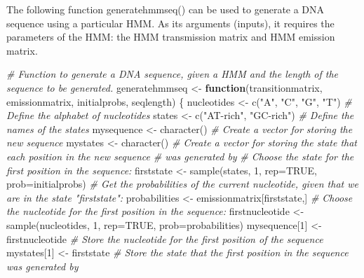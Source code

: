 \documentclass[
]{book}
\newenvironment{Shaded}{\begin{snugshade}}{\end{snugshade}}
\newcommand{\AttributeTok}[1]{\textcolor[rgb]{0.77,0.63,0.00}{#1}}
\newcommand{\CommentTok}[1]{\textcolor[rgb]{0.56,0.35,0.01}{\textit{#1}}}
\newcommand{\ConstantTok}[1]{\textcolor[rgb]{0.00,0.00,0.00}{#1}}
\newcommand{\ControlFlowTok}[1]{\textcolor[rgb]{0.13,0.29,0.53}{\textbf{#1}}}
\newcommand{\DecValTok}[1]{\textcolor[rgb]{0.00,0.00,0.81}{#1}}
\newcommand{\FunctionTok}[1]{\textcolor[rgb]{0.00,0.00,0.00}{#1}}
\newcommand{\NormalTok}[1]{#1}
\newcommand{\OtherTok}[1]{\textcolor[rgb]{0.56,0.35,0.01}{#1}}
\newcommand{\StringTok}[1]{\textcolor[rgb]{0.31,0.60,0.02}{#1}}
\begin{document}
The following function generatehmmseq() can be used to generate a DNA sequence using a particular HMM. As its arguments (inputs), it requires the parameters of the HMM: the HMM transmission matrix and HMM emission matrix.

\begin{Shaded}
\begin{Highlighting}[]
\CommentTok{\# Function to generate a DNA sequence, given a HMM and the length of the sequence to be generated.}
\NormalTok{  generatehmmseq }\OtherTok{\textless{}{-}} \ControlFlowTok{function}\NormalTok{(transitionmatrix, emissionmatrix, initialprobs, seqlength)}
\NormalTok{  \{}
\NormalTok{     nucleotides     }\OtherTok{\textless{}{-}} \FunctionTok{c}\NormalTok{(}\StringTok{"A"}\NormalTok{, }\StringTok{"C"}\NormalTok{, }\StringTok{"G"}\NormalTok{, }\StringTok{"T"}\NormalTok{)   }\CommentTok{\# Define the alphabet of nucleotides}
\NormalTok{     states          }\OtherTok{\textless{}{-}} \FunctionTok{c}\NormalTok{(}\StringTok{"AT{-}rich"}\NormalTok{, }\StringTok{"GC{-}rich"}\NormalTok{) }\CommentTok{\# Define the names of the states}
\NormalTok{     mysequence      }\OtherTok{\textless{}{-}} \FunctionTok{character}\NormalTok{()             }\CommentTok{\# Create a vector for storing the new sequence}
\NormalTok{     mystates        }\OtherTok{\textless{}{-}} \FunctionTok{character}\NormalTok{()             }\CommentTok{\# Create a vector for storing the state that each position in the new sequence}
                                                \CommentTok{\# was generated by}
     \CommentTok{\# Choose the state for the first position in the sequence:}
\NormalTok{     firststate      }\OtherTok{\textless{}{-}} \FunctionTok{sample}\NormalTok{(states, }\DecValTok{1}\NormalTok{, }\AttributeTok{rep=}\ConstantTok{TRUE}\NormalTok{, }\AttributeTok{prob=}\NormalTok{initialprobs)}
     \CommentTok{\# Get the probabilities of the current nucleotide, given that we are in the state "firststate":}
\NormalTok{     probabilities   }\OtherTok{\textless{}{-}}\NormalTok{ emissionmatrix[firststate,]}
     \CommentTok{\# Choose the nucleotide for the first position in the sequence:}
\NormalTok{     firstnucleotide }\OtherTok{\textless{}{-}} \FunctionTok{sample}\NormalTok{(nucleotides, }\DecValTok{1}\NormalTok{, }\AttributeTok{rep=}\ConstantTok{TRUE}\NormalTok{, }\AttributeTok{prob=}\NormalTok{probabilities)}
\NormalTok{     mysequence[}\DecValTok{1}\NormalTok{]   }\OtherTok{\textless{}{-}}\NormalTok{ firstnucleotide         }\CommentTok{\# Store the nucleotide for the first position of the sequence}
\NormalTok{     mystates[}\DecValTok{1}\NormalTok{]     }\OtherTok{\textless{}{-}}\NormalTok{ firststate              }\CommentTok{\# Store the state that the first position in the sequence was generated by}


\end{Highlighting}
\end{Shaded}
\end{document}
